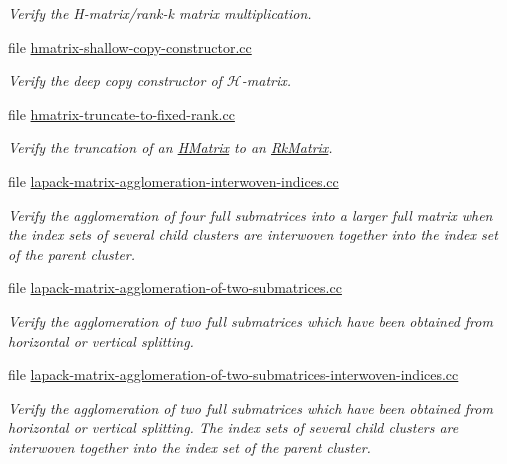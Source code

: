 \begin{DoxyCompactItemize}
\begin{DoxyCompactList}\small\item\em Verify the H-\/matrix/rank-\/k matrix multiplication. \end{DoxyCompactList}\item 
file \hyperlink{hmatrix-shallow-copy-constructor_8cc}{hmatrix-\/shallow-\/copy-\/constructor.\+cc}
\begin{DoxyCompactList}\small\item\em Verify the deep copy constructor of $\mathcal{H}$-\/matrix. \end{DoxyCompactList}\item 
file \hyperlink{hmatrix-truncate-to-fixed-rank_8cc}{hmatrix-\/truncate-\/to-\/fixed-\/rank.\+cc}
\begin{DoxyCompactList}\small\item\em Verify the truncation of an \hyperlink{classHMatrix}{H\+Matrix} to an \hyperlink{classRkMatrix}{Rk\+Matrix}. \end{DoxyCompactList}\item 
file \hyperlink{lapack-matrix-agglomeration-interwoven-indices_8cc}{lapack-\/matrix-\/agglomeration-\/interwoven-\/indices.\+cc}
\begin{DoxyCompactList}\small\item\em Verify the agglomeration of four full submatrices into a larger full matrix when the index sets of several child clusters are interwoven together into the index set of the parent cluster. \end{DoxyCompactList}\item 
file \hyperlink{lapack-matrix-agglomeration-of-two-submatrices_8cc}{lapack-\/matrix-\/agglomeration-\/of-\/two-\/submatrices.\+cc}
\begin{DoxyCompactList}\small\item\em Verify the agglomeration of two full submatrices which have been obtained from horizontal or vertical splitting. \end{DoxyCompactList}\item 
file \hyperlink{lapack-matrix-agglomeration-of-two-submatrices-interwoven-indices_8cc}{lapack-\/matrix-\/agglomeration-\/of-\/two-\/submatrices-\/interwoven-\/indices.\+cc}
\begin{DoxyCompactList}\small\item\em Verify the agglomeration of two full submatrices which have been obtained from horizontal or vertical splitting. The index sets of several child clusters are interwoven together into the index set of the parent cluster. \end{DoxyCompactList}\item 

\end{DoxyCompactItemize}
